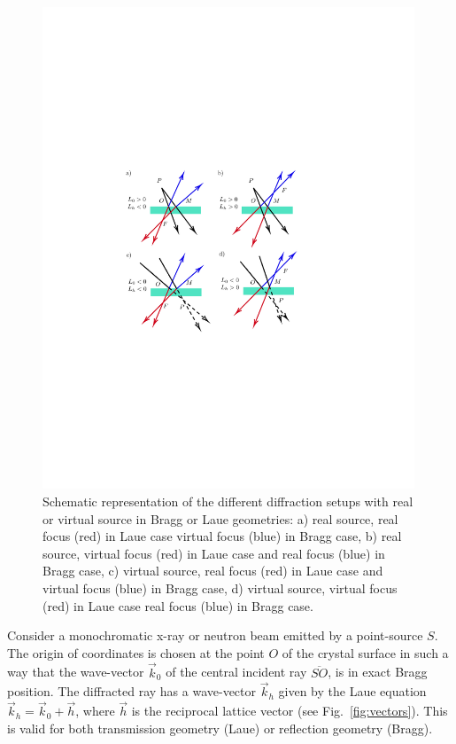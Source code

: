 \documentclass[preprint]{iucr}              %
\newcommand{\inred}[1]{{\color{red}#1}}
\begin{document}
\begin{figure}
\label{fig:geometries}
\caption{\inred{Schematic representation of the different diffraction setups with} real or virtual source in Bragg or Laue geometries:
a) real source, real focus (red) in Laue case virtual focus (blue) in Bragg case,
b) real source, virtual focus (red) in Laue case and real focus (blue) in Bragg case,
c) virtual source, real focus (red) in Laue case and virtual focus (blue) in Bragg case,  
d) virtual source, virtual focus (red) in Laue case real focus (blue) in Bragg case.
}
\includegraphics[width=0.99\textwidth,trim=4cm 9cm 6cm 9cm,clip=true]{fig1.pdf}
\end{figure}

Consider a monochromatic x-ray or neutron beam emitted by a point-source $S$. The origin of coordinates is chosen at the point $O$ of the crystal surface in such a way that the wave-vector  ${\vec k_0}$ of the central incident ray $\overline{SO}$, is in exact Bragg  position. The diffracted ray has a wave-vector $\vec k_h$ given by the Laue equation $\vec k_h = \vec k_0 + \vec h$, where $\vec h$ is the reciprocal lattice vector (see Fig.~\ref{fig:vectors}). This is valid for both transmission geometry (Laue) or reflection geometry (Bragg). 
\end{document}
